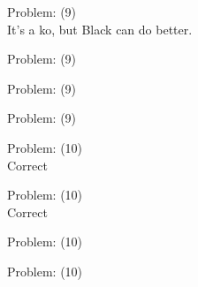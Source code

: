 \documentclass[11pt]{article}
\begin{document}
\begin{minipage}[t]{0.5\textwidth}
  {\centering
  
  Problem: (9)\\
  It's a ko, but Black can do better.\\
  }
\end{minipage}
\begin{minipage}[t]{0.5\textwidth}
  {\centering
  
  Problem: (9)\\
  
  }
\end{minipage}
\begin{minipage}[t]{0.5\textwidth}
  {\centering
  
  Problem: (9)\\
  
  }
\end{minipage}
\begin{minipage}[t]{0.5\textwidth}
  {\centering
  
  Problem: (9)\\
  
  }
\end{minipage}
\begin{minipage}[t]{0.5\textwidth}
  {\centering
  
  Problem: (10)\\
  Correct\\
  }
\end{minipage}
\begin{minipage}[t]{0.5\textwidth}
  {\centering
  
  Problem: (10)\\
  Correct\\
  }
\end{minipage}
\begin{minipage}[t]{0.5\textwidth}
  {\centering
  
  Problem: (10)\\
  
  }
\end{minipage}
\begin{minipage}[t]{0.5\textwidth}
  {\centering
  
  Problem: (10)\\
  
  }
\end{minipage}
\end{document}
